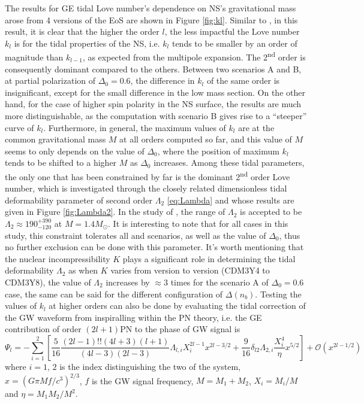 The results for \gls{GE} tidal Love number's dependence on \gls{NS}'s gravitational mass arose from 4 versions of the \gls{EoS} are shown in Figure \ref{fig:kl}. Similar to \cite{perot2021role}, in this result, it is clear that the higher the order $l$, the less impactful the Love number $k_l$ is for the tidal properties of the \gls{NS}, i.e. $k_l$ tends to be smaller by an order of magnitude than $k_{l-1}$, as expected from the multipole expansion. The 2\textsuperscript{nd} order is consequently dominant compared to the others. Between two scenarios A and B, at partial polarization of $\Delta_0 = 0.6$, the difference in $k_l$ of the same order is insignificant, except for the small difference in the low mass section. On the other hand, for the case of higher spin polarity in the \gls{NS} surface, the results are much more distinguishable, as the computation with scenario B gives rise to a ``steeper'' curve of $k_l$. Furthermore, in general, the maximum values of $k_l$ are at the common gravitational mass $M$ at all orders computed so far, and this value of $M$ seems to only depends on the value of $\Delta_0$, where the position of maximum $k_l$ tends to be shifted to a higher $M$ as $\Delta_0$ increases. Among these tidal parameters, the only one that has been constrained by far is the dominant 2\textsuperscript{nd} order Love number, which is investigated through the closely related dimensionless tidal deformability parameter of second order $\Lambda_2$ \eqref{eq:Lambda} and whose results are given in Figure \ref{fig:Lambda2}. In the study of \cite{abbott2018gw170817}, the range of $\Lambda_2$ is accepted to be $\Lambda_2 \approx 190^{+390}_{-120}$ at $M=1.4M_\odot$. It is interesting to note that for all cases in this study, this constraint tolerates all  and scenarios, as well as the value of $\Delta_0$, thus no further exclusion can be done with this parameter. It's worth mentioning that the nuclear incompressibility $K$ plays a significant role in determining the tidal deformability $\Lambda_2$ as when $K$ varies from version to version (CDM3Y4 to CDM3Y8), the value of $\Lambda_2$ increases by $\approx 3$ times for the scenario A of $\Delta_0 = 0.6$ case, the same can be said for the different configuration of $\Delta(n_b)$. Testing the values of $k_l$ at higher orders can also be done by evaluating the tidal correction of the \gls{GW} waveform from inspiralling  within the PN theory, i.e. the \gls{GE} contribution of order $(2l+1)$PN to the phase of \gls{GW} signal is \citep{perot2021role, yagi2014multipole}
\begin{equation}
    \Psi_l = - \sum^{2}_{i=1} \left[ \frac{5}{16} \frac{(2l-1)!! (4l+3)(l+1)}{(4l-3)(2l-3)} \Lambda_{l,i} X_i^{2l-1} x^{2l - 3/2} + \frac{9}{16} \delta_{l2} \Lambda_{2, i} \frac{X_i^4}{\eta} x^{5/2} \right] + \mathcal{O}(x^{2l-1/2})
\end{equation}
where $i=1,\,2$ is the index distinguishing the two  of the system, $x=\left( G\pi Mf/c^3 \right)^{2/3}$, $f$ is the \gls{GW} signal frequency, $M=M_1 + M_2$, $X_i = M_i/M$ and $\eta = M_1 M_2/M^2$.

